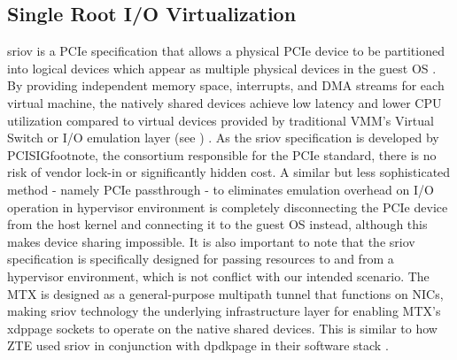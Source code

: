 \subsection{Single Root I/O Virtualization}
\ac{sriov} is a \ac{PCIe} specification that allows a physical \ac{PCIe} device to be partitioned into logical devices which appear as multiple physical devices in the guest \ac{OS} \cite{ibm_sriov}\cite{vmware_sriov}. 
By providing independent memory space, interrupts, and \ac{DMA} streams for each virtual machine, the natively shared devices achieve low latency and lower CPU utilization compared to virtual devices provided by traditional \ac{VMM}'s Virtual Switch or  I/O emulation layer (see ) \cite{intel_sriov}.
As the \ac{sriov} specification is developed by \ac{PCISIGfootnote}, the consortium responsible for the \ac{PCIe} standard, there is no risk of vendor lock-in or significantly hidden cost.
A similar but less sophisticated method - namely \ac{PCIe} passthrough - to eliminates emulation overhead on I/O operation in hypervisor environment is completely disconnecting the \ac{PCIe} device from the host kernel and connecting it to the guest \ac{OS} instead, although this makes device sharing impossible.
It is also important to note that the \ac{sriov} specification is specifically designed for passing resources to and from a hypervisor environment, which is not conflict with our intended scenario.
The \ac{MTX} is designed as a general-purpose multipath tunnel that functions on \ac{NIC}s, making \ac{sriov} technology the underlying infrastructure layer for enabling \ac{MTX}'s \ac{xdppage} sockets to operate on the native shared devices.
This is similar to how \ac{ZTE} used \ac{sriov} in conjunction with \ac{dpdkpage} in their software stack \cite{zte_upf_full_whitepaper}.

